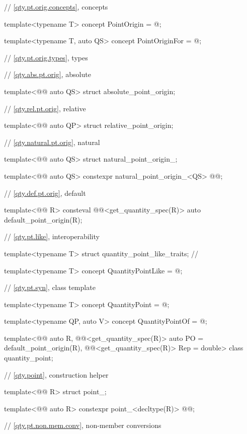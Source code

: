 \begin{codeblock}
{// \ref{qty.pt.orig.concepts}, concepts

template<typename T>
concept PointOrigin = @\seebelownc@;

template<typename T, auto QS>
concept PointOriginFor = @\seebelownc@;

// \ref{qty.pt.orig.types}, types

// \ref{qty.abs.pt.orig}, absolute

template<@@ auto QS>
struct absolute_point_origin;

// \ref{qty.rel.pt.orig}, relative

template<@@ auto QP>
struct relative_point_origin;

// \ref{qty.natural.pt.orig}, natural

template<@@ auto QS>
struct natural_point_origin_;

template<@@ auto QS>
constexpr natural_point_origin_<QS> @@{};

// \ref{qty.def.pt.orig}, default

template<@@ R>
consteval @@<get_quantity_spec(R{})> auto default_point_origin(R);

// \ref{qty.pt.like}, interoperability

template<typename T>
struct quantity_point_like_traits;  // \notdef

template<typename T>
concept QuantityPointLike = @\seebelownc@;

// \ref{qty.pt.syn}, class template 

template<typename T>
concept QuantityPoint = @\seebelownc@;

template<typename QP, auto V>
concept QuantityPointOf = @\seebelownc@;

template<@@ auto R,
         @@<get_quantity_spec(R)> auto PO = default_point_origin(R),
         @@<get_quantity_spec(R)> Rep = double>
class quantity_point;

// \ref{qty.point}, construction helper 

template<@@ R>
struct point_;

template<@@ auto R>
constexpr point_<decltype(R)> @@{};

// \ref{qty.pt.non.mem.conv}, non-member conversions

}
\end{codeblock}
